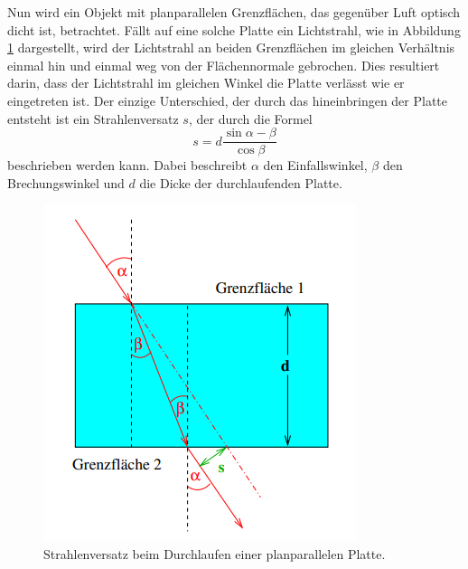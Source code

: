 \noindent Nun wird ein Objekt mit planparallelen Grenzflächen, das gegenüber Luft optisch dicht ist, betrachtet.
Fällt auf eine solche Platte ein Lichtstrahl, wie in Abbildung \ref{fig:StrV} dargestellt, wird
der Lichtstrahl an beiden Grenzflächen im gleichen Verhältnis einmal hin und einmal weg von der 
Flächennormale gebrochen. Dies resultiert darin, dass der Lichtstrahl im gleichen Winkel die Platte 
verlässt wie er eingetreten ist. Der einzige Unterschied, der durch das hineinbringen der Platte entsteht
ist ein Strahlenversatz $s$, der durch die Formel
\begin{equation}
    s=d\frac{\sin{\alpha-\beta}}{\cos{\beta}}
    \label{eq:Strahlenversatz}
\end{equation}
beschrieben werden kann. Dabei beschreibt $\alpha$ den Einfallswinkel, $\beta$ den Brechungswinkel und $d$
die Dicke der durchlaufenden Platte.
\begin{figure}[H]
    \centering
    \includegraphics{content/Strahlenversatz.png}
    \caption{Strahlenversatz beim Durchlaufen einer planparallelen Platte\cite{V400}.}
    \label{fig:StrV}
\end{figure}
